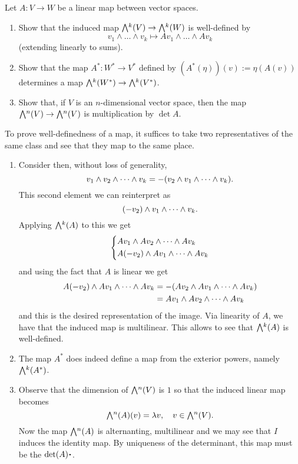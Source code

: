 \documentclass[12pt]{memoir}
\begin{document}

\begin{Ej}
    Let $A: V \to W$ be a linear map between vector spaces.
	\begin{enumerate}
		\item Show that the induced map $\exterior^k(V) \to \exterior^k(W)$ is well-defined by
		\[
			v_1 \wedge \ldots \wedge v_k \mapsto Av_1 \wedge \ldots \wedge Av_k
		\]
		(extending linearly to sums).
		
		\item Show that the map $A^*: W^* \to V^*$ defined by $(A^\ast(\eta))(v) := \eta(A(v))$ determines a map $\exterior^k(W^\ast) \to \exterior^k(V^\ast)$.
		
		\item Show that, if $V$ is an $n$-dimensional vector space, then the map $\exterior^n(V) \to \exterior^n(V)$ is multiplication by $\det A$.
	\end{enumerate}
\end{Ej}

\begin{ptcbr}
    To prove well-definedness of a map, it suffices to take two representatives of the same class and see that they map to the same place.
    \begin{enumerate}
        \item Consider then, without loss of generality,
        $$v_1\wedge v_2\wedge\cdots\wedge v_k=-(v_2\wedge v_1\wedge\cdots\wedge v_k).$$
        This second element we can reinterpret as 
        $$(-v_2)\wedge v_1\wedge\cdots\wedge v_k.$$
        Applying $\exterior^k(A)$ to this we get
        $$
        \left\lbrace
        \begin{aligned}
            &Av_1\wedge Av_2\wedge\cdots\wedge Av_k\\
            &A(-v_2)\wedge Av_1\wedge\cdots\wedge Av_k
        \end{aligned}
        \right.
        $$
        and using the fact that $A$ is linear we get 
        \begin{align*}
        A(-v_2)\wedge Av_1\wedge\cdots\wedge Av_k&=-(Av_2\wedge Av_1\wedge\cdots\wedge Av_k)\\
        &=Av_1\wedge Av_2\wedge\cdots\wedge Av_k
        \end{align*}
        and this is the desired representation of the image. Via linearity of $A$, we have that the induced map is multilinear. This allows to see that $\exterior^k(A)$ is well-defined.
        \item The map $A^\ast$ does indeed define a map from the exterior powers, namely $\exterior^k(A^\ast)$. 
        \item Observe that the dimension of $\exterior^n(V)$ is $1$ so that the induced linear map becomes
        $$\exterior^n(A)(v)=\la v,\quad v\in\exterior^n(V).$$
        Now the map $\exterior^n(A)$ is alternanting, multilinear and we may see that $I$ induces the identity map. By uniqueness of the determinant, this map must be the $\det(A)\.$.
    \end{enumerate}
\end{ptcbr}
\end{document}
